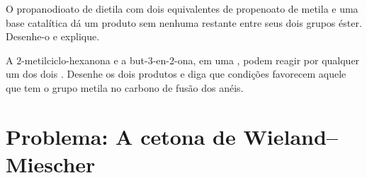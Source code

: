 \begin{exercise}[$\star\star\star$]\label{exo:b2:conjugate-additions:11}
O propanodioato de dietila com dois equivalentes de propenoato de metila e uma base catalítica dá um
produto sem nenhuma  restante entre seus dois grupos éster. Desenhe-o e explique.
\end{exercise}

\begin{exercise}[$\star\star\star$]\label{exo:b2:conjugate-additions:12}
A 2-metilciclo-hexanona e a but-3-en-2-ona, em uma , podem reagir por qualquer
um dos dois . Desenhe os dois produtos e diga que condições favorecem aquele que tem o grupo
metila no carbono de fusão dos anéis.
\end{exercise}

\section{Problema: A cetona de Wieland--Miescher}

